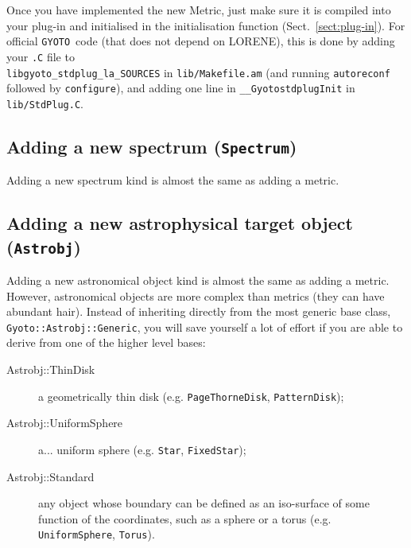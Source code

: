 \documentclass[a4paper,12pt]{article}
\newcommand{\GYOTO}{\texttt{GYOTO}}
\newcommand{\Astrobj}{\texttt{Astrobj}}
\newcommand{\Spectrum}{\texttt{Spectrum}}
\begin{document}
Once you have implemented the new Metric, just make sure it is
compiled into your plug-in and initialised in the initialisation
function (Sect.~\ref{sect:plug-in}). For official \GYOTO\ code (that
does not depend on LORENE), this is done by adding your \texttt{.C}
file to\\
\texttt{libgyoto\_stdplug\_la\_SOURCES} in
\texttt{lib/Makefile.am} (and running \texttt{autoreconf} followed by
\texttt{configure}), and adding one line in
\texttt{\_\_GyotostdplugInit} in \texttt{lib/StdPlug.C}.

\subsection{Adding a new spectrum (\Spectrum)}

Adding a new spectrum kind is almost the same as adding a metric.

\subsection{Adding a new astrophysical target object (\Astrobj)}
\label{newastrobj}

Adding a new astronomical object kind is almost the same as adding a
metric. However, astronomical objects are more complex than metrics
(they can have abundant hair). Instead of inheriting directly from the
most generic base class, \texttt{Gyoto::Astrobj::Generic}, you will
save yourself a lot of effort if you are able to derive from one of
the higher level bases:
\begin{description}
\item[Astrobj::ThinDisk] a geometrically thin disk
  (e.g. \texttt{PageThorneDisk}, \texttt{PatternDisk});
\item[Astrobj::UniformSphere] a... uniform sphere (e.g. \texttt{Star},
  \texttt{FixedStar});
\item[Astrobj::Standard] any object whose boundary can be defined as
  an iso-surface of some function of the coordinates, such as a sphere
  or a torus (e.g. \texttt{UniformSphere}, \texttt{Torus}).
\end{description}
\end{document}
